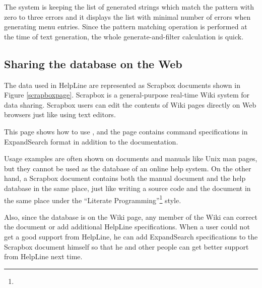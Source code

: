 \documentclass[manuscript,anonymous,review]{acmart}
\def\HL{\textsf{HelpLine}}
\def\ES{\textsf{ExpandSearch}}
\def\SB{\textsf{Scrapbox}}
\begin{document}
The system is keeping the list of generated strings
which match the pattern with zero to three errors
and it displays the list with minimal number of errors
when generating menu entries.
% 
Since the pattern matching operation is performed at the time of text generation,
the whole generate-and-filter calculation is quick.



\subsection{Sharing the database on the Web}

The data used in {\HL} are represented as {\SB} documents
shown in Figure \ref{scrapboxpage}.
%
{\SB} is a general-purpose real-time Wiki system for data sharing.
{\SB} users can edit the contents of Wiki pages directly
on Web browsers just like using text editors.

This page shows how to use , and
the page contains command specifications in {\ES} format
in addition to the documentation.


Usage examples are often shown on documents and manuals like Unix man pages,
but they cannot be used as the database of an online help system.
On the other hand,
a {\SB} document contains both the manual document and the help database
in the same place, just like
writing a source code and the document in the same place
under the ``Literate Programming''\footnote{
} style.

Also, since the database is on the Wiki page, any member of the
Wiki can correct the document or add additional {\HL} specifications.
When a user could not get a good support from {\HL}, he can add
{\ES} specifications to the {\SB} document himself
so that he and other people can get better support
from {\HL} next time.
\end{document}
